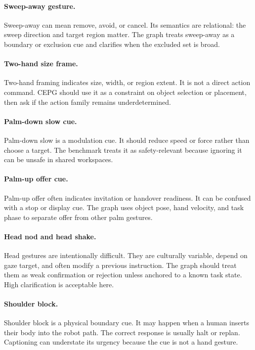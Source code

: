 \documentclass{article}
\newcommand{\method}{CEPG}
\begin{document}
\paragraph{Sweep-away gesture.}
Sweep-away can mean remove, avoid, or cancel. Its semantics are relational: the sweep direction and target region matter. The graph treats sweep-away as a boundary or exclusion cue and clarifies when the excluded set is broad.

\paragraph{Two-hand size frame.}
Two-hand framing indicates size, width, or region extent. It is not a direct action command. \method{} should use it as a constraint on object selection or placement, then ask if the action family remains underdetermined.

\paragraph{Palm-down slow cue.}
Palm-down slow is a modulation cue. It should reduce speed or force rather than choose a target. The benchmark treats it as safety-relevant because ignoring it can be unsafe in shared workspaces.

\paragraph{Palm-up offer cue.}
Palm-up offer often indicates invitation or handover readiness. It can be confused with a stop or display cue. The graph uses object pose, hand velocity, and task phase to separate offer from other palm gestures.

\paragraph{Head nod and head shake.}
Head gestures are intentionally difficult. They are culturally variable, depend on gaze target, and often modify a previous instruction. The graph should treat them as weak confirmation or rejection unless anchored to a known task state. High clarification is acceptable here.

\paragraph{Shoulder block.}
Shoulder block is a physical boundary cue. It may happen when a human inserts their body into the robot path. The correct response is usually halt or replan. Captioning can understate its urgency because the cue is not a hand gesture.
\end{document}
